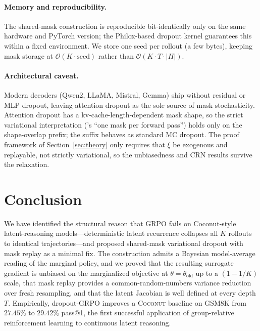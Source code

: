 \documentclass[11pt]{article}
\theoremstyle{definition}
\theoremstyle{remark}
\newcommand{\old}{\mathrm{old}}
\begin{document}
\paragraph{Memory and reproducibility.}
The shared-mask construction is reproducible bit-identically only on
the same hardware and PyTorch version; the Philox-based dropout
kernel guarantees this within a fixed environment.  We store one
seed per rollout (a few bytes), keeping mask storage at
$\mathcal{O}(K \cdot \mathrm{seed})$ rather than
$\mathcal{O}(K \cdot T \cdot |H|)$.

\paragraph{Architectural caveat.}
Modern decoders (Qwen2, LLaMA, Mistral, Gemma) ship without residual
or MLP dropout, leaving attention dropout as the sole source of mask
stochasticity.  Attention dropout has a kv-cache-length-dependent
mask shape, so the strict variational interpretation
(\citet{gal2016dropout}'s ``one mask per forward pass'') holds only
on the shape-overlap prefix; the suffix behaves as standard MC
dropout.  The proof framework of Section~\ref{sec:theory} only
requires that $\xi$ be exogenous and replayable, not strictly
variational, so the unbiasedness and CRN results survive the
relaxation.

\section{Conclusion}
\label{sec:concl}

We have identified the structural reason that GRPO fails on
Coconut-style latent-reasoning models---deterministic latent
recurrence collapses all $K$ rollouts to identical trajectories---and
proposed shared-mask variational dropout with mask replay as a
minimal fix.  The construction admits a Bayesian model-average
reading of the marginal policy, and we proved that the resulting
surrogate gradient is unbiased on the marginalized objective at
$\theta = \theta_\old$ up to a $(1 - 1/K)$ scale, that mask replay
provides a common-random-numbers variance reduction over fresh
resampling, and that the latent Jacobian is well defined at every
depth $T$.  Empirically, dropout-GRPO improves a \textsc{Coconut}
baseline on \textsc{GSM8K} from $27.45\%$ to $29.42\%$ pass@1, the
first successful application of group-relative reinforcement learning
to continuous latent reasoning.
\end{document}
